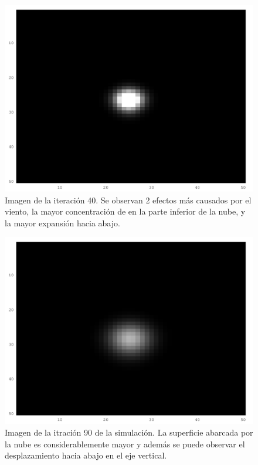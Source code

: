 \documentclass[twocolumn,a4paper,10pt]{article}
\begin{document}
\begin{figure}[H]
        \includegraphics[width=\linewidth]{./images/iteration-40.png}
        \caption{Imagen de la iteraci\'on 40. Se observan 2 efectos m\'as causados por el viento, la mayor concentraci\'on de en la parte inferior de la nube, y 
        la mayor expansi\'on hacia abajo.}
        \label{fig:40-iteraciones}
\end{figure}

\begin{figure}[H]
        \includegraphics[width=\linewidth]{./images/iteration-90.png}
        \caption{Imagen de la itraci\'on 90 de la simulaci\'on. La superficie abarcada por la nube es considerablemente mayor y además se puede observar 
        el desplazamiento hacia abajo en el eje vertical.}
        \label{fig:90-iteraciones}
\end{figure}
\end{document}
